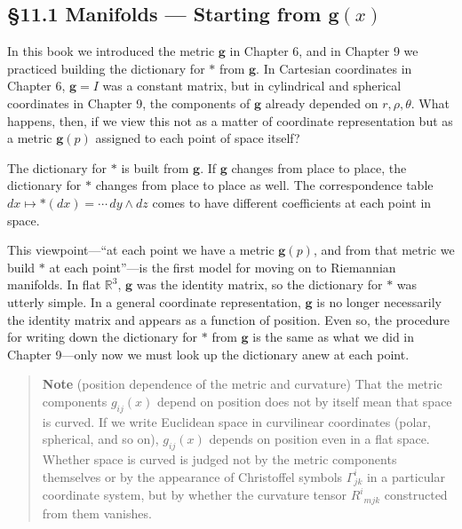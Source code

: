 \documentclass[a4paper,12pt,openany]{book}
\begin{document}
\hypertarget{manifolds-starting-from-mathbfgx}{%
\subsection{\texorpdfstring{§11.1 Manifolds — Starting from
\(\mathbf{g}(x)\)}{§11.1 Manifolds — Starting from \textbackslash mathbf\{g\}(x)}}\label{manifolds-starting-from-mathbfgx}}

In this book we introduced the metric \(\mathbf{g}\) in Chapter 6, and
in Chapter 9 we practiced building the dictionary for \(\ast\) from
\(\mathbf{g}\). In Cartesian coordinates in Chapter 6,
\(\mathbf{g} = I\) was a constant matrix, but in cylindrical and
spherical coordinates in Chapter 9, the components of \(\mathbf{g}\)
already depended on \(r, \rho, \theta\). What happens, then, if we view
this not as a matter of coordinate representation but as a metric
\(\mathbf{g}(p)\) assigned to each point of space itself?

The dictionary for \(\ast\) is built from \(\mathbf{g}\). If
\(\mathbf{g}\) changes from place to place, the dictionary for \(\ast\)
changes from place to place as well. The correspondence table
\(dx \mapsto \ast(dx) = \cdots\, dy \wedge dz\) comes to have different
coefficients at each point in space.

This viewpoint—``at each point we have a metric \(\mathbf{g}(p)\), and
from that metric we build \(\ast\) at each point''—is the first model
for moving on to Riemannian manifolds. In flat \(\mathbb{R}^3\),
\(\mathbf{g}\) was the identity matrix, so the dictionary for \(\ast\)
was utterly simple. In a general coordinate representation,
\(\mathbf{g}\) is no longer necessarily the identity matrix and appears
as a function of position. Even so, the procedure for writing down the
dictionary for \(\ast\) from \(\mathbf{g}\) is the same as what we did
in Chapter 9—only now we must look up the dictionary anew at each
point.

\begin{quote}
\textbf{Note} (position dependence of the metric and curvature) That the
metric components \(g_{ij}(x)\) depend on position does not by itself
mean that space is curved. If we write Euclidean space in curvilinear
coordinates (polar, spherical, and so on), \(g_{ij}(x)\) depends on
position even in a flat space. Whether space is curved is judged not by
the metric components themselves or by the appearance of Christoffel
symbols \(\Gamma^i_{jk}\) in a particular coordinate system, but by
whether the curvature tensor \(R^i{}_{mjk}\) constructed from them
vanishes.
\end{quote}
\end{document}
